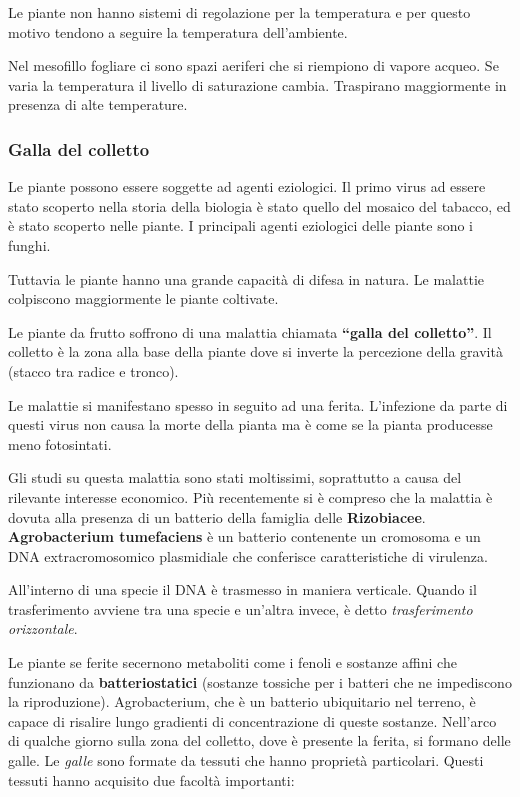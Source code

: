 \documentclass[]{article}
\begin{document}
Le piante non hanno sistemi di regolazione per la temperatura e per
questo motivo tendono a seguire la temperatura dell'ambiente.

Nel mesofillo fogliare ci sono spazi aeriferi che si riempiono di vapore
acqueo. Se varia la temperatura il livello di saturazione cambia.
Traspirano maggiormente in presenza di alte temperature.

\subsubsection{Galla del colletto}\label{galla-del-colletto}

Le piante possono essere soggette ad agenti eziologici. Il primo virus
ad essere stato scoperto nella storia della biologia è stato quello del
mosaico del tabacco, ed è stato scoperto nelle piante. I principali
agenti eziologici delle piante sono i funghi.

Tuttavia le piante hanno una grande capacità di difesa in natura. Le
malattie colpiscono maggiormente le piante coltivate.

Le piante da frutto soffrono di una malattia chiamata \textbf{``galla
del colletto''}. Il colletto è la zona alla base della piante dove si
inverte la percezione della gravità (stacco tra radice e tronco).

Le malattie si manifestano spesso in seguito ad una ferita. L'infezione
da parte di questi virus non causa la morte della pianta ma è come se la
pianta producesse meno fotosintati.

Gli studi su questa malattia sono stati moltissimi, soprattutto a causa
del rilevante interesse economico. Più recentemente si è compreso che la
malattia è dovuta alla presenza di un batterio della famiglia delle
\textbf{Rizobiacee}. \textbf{Agrobacterium tumefaciens} è un batterio
contenente un cromosoma e un DNA extracromosomico plasmidiale che
conferisce caratteristiche di virulenza.

All'interno di una specie il DNA è trasmesso in maniera verticale.
Quando il trasferimento avviene tra una specie e un'altra invece, è
detto \emph{trasferimento orizzontale}.

Le piante se ferite secernono metaboliti come i fenoli e sostanze affini
che funzionano da \textbf{batteriostatici} (sostanze tossiche per i
batteri che ne impediscono la riproduzione). Agrobacterium, che è un
batterio ubiquitario nel terreno, è capace di risalire lungo gradienti
di concentrazione di queste sostanze. Nell'arco di qualche giorno sulla
zona del colletto, dove è presente la ferita, si formano delle galle. Le
\emph{galle} sono formate da tessuti che hanno proprietà particolari.
Questi tessuti hanno acquisito due facoltà importanti:
\end{document}
